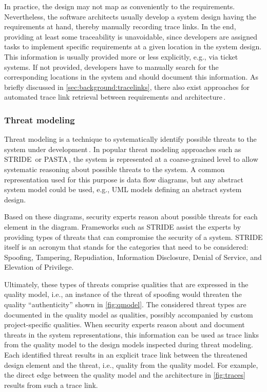 	In practice, the design may not map as conveniently to the requirements.
	Nevertheless, the software architects usually develop a system design having the requirements at hand, thereby manually recording trace links.
	In the end, providing at least some traceability is unavoidable, since developers are assigned tasks to implement specific requirements at a given location in the system design.
	This information is usually provided more or less explicitly, e.g., via ticket systems.
	If not provided, developers have to manually search for the corresponding locations in the system and should document this information.
	As briefly discussed in \autoref{sec:background:tracelinks}, there also exist approaches for automated trace link retrieval between requirements and architecture\,\cite{Goknil2014,Keim2024}.

\subsubsection{Threat modeling}
Threat modeling is a technique to systematically identify possible threats to the system under development\,\cite{Shostack2008}.
In popular threat modeling approaches such as STRIDE\,\cite{STRIDE,Shostack2008} or PASTA\,\cite{pasta}, the system is represented at a coarse-grained level to allow systematic reasoning about possible threats to the system.
A common representation used for this purpose is data flow diagrams, but any abstract system model could be used, e.g., UML models defining an abstract system design.

Based on these diagrams, security experts reason about possible threats for each element in the diagram. Frameworks such as STRIDE assist the experts by providing types of threats that can compromise the security of a system. STRIDE itself is an acronym that stands for the categories that need to be considered: Spoofing, Tampering, Repudiation, Information Disclosure, Denial of Service, and Elevation of Privilege.

Ultimately, these types of threats comprise qualities that are expressed in the quality model, i.e., an instance of the threat of spoofing would threaten the quality ``authenticity'' shown in \autoref{fig:qmodel}.
The considered threat types are documented in the quality model as qualities, possibly accompanied by custom project-specific qualities.
When security experts reason about and document threats in the system representations, this information can be used as trace links from the quality model to the design models inspected during threat modeling.
	Each identified threat results in an explicit trace link between the threatened design element and the threat, i.e., quality from the quality model.
	For example, the direct edge between the quality model and the architecture in \autoref{fig:traces} results from such a trace link.

